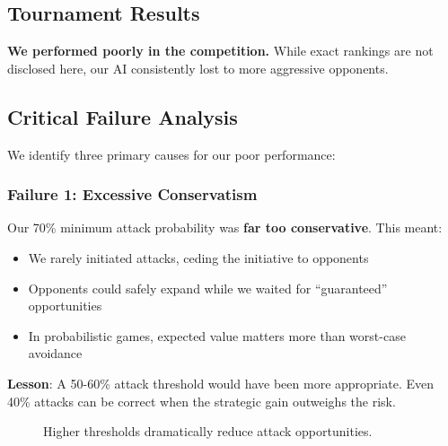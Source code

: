 \documentclass[11pt,a4paper]{article}
\begin{document}
\subsection{Tournament Results}

\textbf{We performed poorly in the competition.} While exact rankings are not disclosed here, our AI consistently lost to more aggressive opponents.

\subsection{Critical Failure Analysis}

We identify three primary causes for our poor performance:

\subsubsection{Failure 1: Excessive Conservatism}

\begin{tcolorbox}[colback=red!5, colframe=red!50!black, title=\textbf{Critical Issue: 70\% Attack Threshold}]
Our 70\% minimum attack probability was \textbf{far too conservative}. This meant:
\begin{itemize}
    \item We rarely initiated attacks, ceding the initiative to opponents
    \item Opponents could safely expand while we waited for ``guaranteed'' opportunities
    \item In probabilistic games, expected value matters more than worst-case avoidance
\end{itemize}
\textbf{Lesson}: A 50-60\% attack threshold would have been more appropriate. Even 40\% attacks can be correct when the strategic gain outweighs the risk.
\end{tcolorbox}

\begin{figure}[H]
\centering
{}
\caption{Higher thresholds dramatically reduce attack opportunities.}
\label{fig:threshold_sensitivity}
\end{figure}
\end{document}
